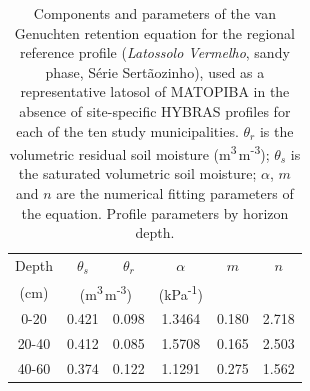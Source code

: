 \begin{table}[t]
\centering
\caption{Components and parameters of the van Genuchten \citep{vanGenuchten1980} retention equation for the regional reference profile (\textit{Latossolo Vermelho}, sandy phase, S\'erie Sert\~aozinho), used as a representative latosol of MATOPIBA in the absence of site-specific HYBRAS \citep{Ottoni2018HYBRAS} profiles for each of the ten study municipalities. \(\theta_r\) is the volumetric residual soil moisture (m\textsuperscript{3}\,m\textsuperscript{-3}); \(\theta_s\) is the saturated volumetric soil moisture; \(\alpha\), \(m\) and \(n\) are the numerical fitting parameters of the equation. Profile parameters by horizon depth.}
\label{tab:van-genuchten-matopiba}
\begin{tabular}{cccccc}
\toprule
Depth & \(\theta_s\) & \(\theta_r\) & \(\alpha\) & \(m\) & \(n\) \\
(cm) & \multicolumn{2}{c}{(m\textsuperscript{3}\,m\textsuperscript{-3})} & (kPa\textsuperscript{-1}) & & \\
\midrule
0-20 & 0.421 & 0.098 & 1.3464 & 0.180 & 2.718 \\
20-40 & 0.412 & 0.085 & 1.5708 & 0.165 & 2.503 \\
40-60 & 0.374 & 0.122 & 1.1291 & 0.275 & 1.562 \\
\bottomrule
\end{tabular}
\end{table}